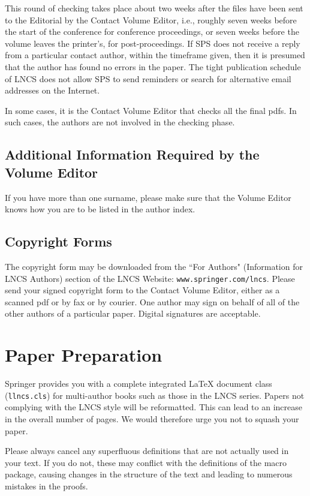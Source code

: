 \documentclass[runningheads,a4paper]{llncs}
\begin{document}
This round of checking takes place about two weeks after the files have
been sent to the Editorial by the Contact Volume Editor, i.e., roughly
seven weeks before the start of the conference for conference
proceedings, or seven weeks before the volume leaves the printer's, for
post-proceedings. If SPS does not receive a reply from a particular
contact author, within the timeframe given, then it is presumed that the
author has found no errors in the paper. The tight publication schedule
of LNCS does not allow SPS to send reminders or search for alternative
email addresses on the Internet.

In some cases, it is the Contact Volume Editor that checks all the final
pdfs. In such cases, the authors are not involved in the checking phase.

\subsection{Additional Information Required by the Volume Editor}

If you have more than one surname, please make sure that the Volume Editor
knows how you are to be listed in the author index.

\subsection{Copyright Forms}

The copyright form may be downloaded from the ``For Authors"
(Information for LNCS Authors) section of the LNCS Website:
\texttt{www.springer.com/lncs}. Please send your signed copyright form
to the Contact Volume Editor, either as a scanned pdf or by fax or by
courier. One author may sign on behalf of all of the other authors of a
particular paper. Digital signatures are acceptable.

\section{Paper Preparation}

Springer provides you with a complete integrated \LaTeX{} document class
(\texttt{llncs.cls}) for multi-author books such as those in the LNCS
series. Papers not complying with the LNCS style will be reformatted.
This can lead to an increase in the overall number of pages. We would
therefore urge you not to squash your paper.

Please always cancel any superfluous definitions that are
not actually used in your text. If you do not, these may conflict with
the definitions of the macro package, causing changes in the structure
of the text and leading to numerous mistakes in the proofs.
\end{document}
